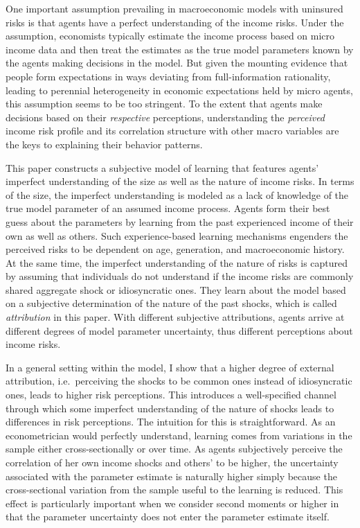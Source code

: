 \documentclass[12pt,notitlepage,onecolumn,aps,pra]{article}
\begin{document}
One important assumption prevailing in macroeconomic models with
uninsured risks is that agents have a perfect understanding of the
income risks. Under the assumption, economists typically estimate the
income process based on micro income data and then treat the estimates
as the true model parameters known by the agents making decisions in the
model. But given the mounting evidence that people form expectations in
ways deviating from full-information rationality, leading to perennial
heterogeneity in economic expectations held by micro agents, this
assumption seems to be too stringent. To the extent that agents make
decisions based on their \emph{respective} perceptions, understanding
the \emph{perceived} income risk profile and its correlation structure
with other macro variables are the keys to explaining their behavior
patterns.

This paper constructs a subjective model of learning that features
agents' imperfect understanding of the size as well as the nature of
income risks. In terms of the size, the imperfect understanding is
modeled as a lack of knowledge of the true model parameter of an assumed
income process. Agents form their best guess about the parameters by
learning from the past experienced income of their own as well as
others. Such experience-based learning mechanisms engenders the
perceived risks to be dependent on age, generation, and macroeconomic
history. At the same time, the imperfect understanding of the nature of
risks is captured by assuming that individuals do not understand if the
income risks are commonly shared aggregate shock or idiosyncratic ones.
They learn about the model based on a subjective determination of the
nature of the past shocks, which is called \emph{attribution} in this
paper. With different subjective attributions, agents arrive at
different degrees of model parameter uncertainty, thus different
perceptions about income risks.

In a general setting within the model, I show that a higher degree of
external attribution, i.e.~perceiving the shocks to be common ones
instead of idiosyncratic ones, leads to higher risk perceptions. This
introduces a well-specified channel through which some imperfect
understanding of the nature of shocks leads to differences in risk
perceptions. The intuition for this is straightforward. As an
econometrician would perfectly understand, learning comes from
variations in the sample either cross-sectionally or over time. As
agents subjectively perceive the correlation of her own income shocks
and others' to be higher, the uncertainty associated with the parameter
estimate is naturally higher simply because the cross-sectional
variation from the sample useful to the learning is reduced. This effect
is particularly important when we consider second moments or higher in
that the parameter uncertainty does not enter the parameter estimate
itself.
\end{document}
